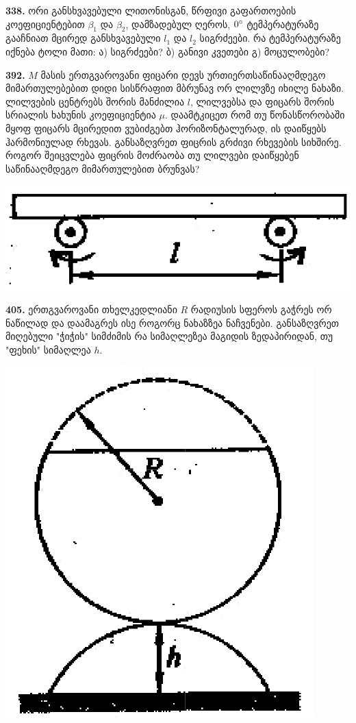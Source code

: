 \documentclass[12pt,a4paper,]{report}
\begin{document}
\textbf{338.} ორი განსხვავებული ლითონისგან, წრფივი გაფართოების კოეფიციენტებით $\beta_1$ და $\beta_2$, დამზადებულ ღეროს, $0\degree$ ტემპერატურაზე გააჩნიათ მცირედ განსხვავებული $l_1$ და $l_2$ სიგრძეები. რა ტემპერატურაზე იქნება ტოლი მათი: ა) სიგრძეები? ბ) განივი კვეთები გ) მოცულობები?

\textbf{392.} $M$ მასის ერთგვაროვანი ფიცარი დევს ურთიერთსაწინააღმდეგო მიმართულებებით დიდი სისწრაფით მბრუნავ ორ ლილვზე იხილე ნახაზი. ლილვების ცენტრებს შორის მანძილია $l$, ლილვებსა და ფიცარს შორის სრიალის ხახუნის კოეფიციენტია $\mu$. დაამტკიცეთ რომ თუ წონასწორობაში მყოფ ფიცარს მცირედით ვუბიძგებთ ჰორიზონტალურად, ის დაიწყებს ჰარმონიულად რხევას. განსაზღვრეთ ფიცრის გრძივი რხევების სიხშირე. როგორ შეიცვლება ფიცრის მოძრაობა თუ ლილვები დაიწყებენ საწინააღმდეგო მიმართულებით ბრუნვას?
	\begin{center}
		\includegraphics[scale=0.4]{images/392}
	\end{center}

\textbf{405.} ერთგვაროვანი თხელკედლიანი $R$ რადიუსის სფეროს გაჭრეს ორ ნაწილად და დაამაგრეს ისე როგორც ნახაზზეა ნაჩვენები. განსაზღვრეთ მიღებული "ჭიჭის" სიმძიმის რა სიმაღლეზეა მაგიდის ზედაპირიდან, თუ "ფეხის" სიმაღლეა $h$.
	\begin{center}
		\includegraphics[scale=0.4]{images/405}
	\end{center}
\end{document}
